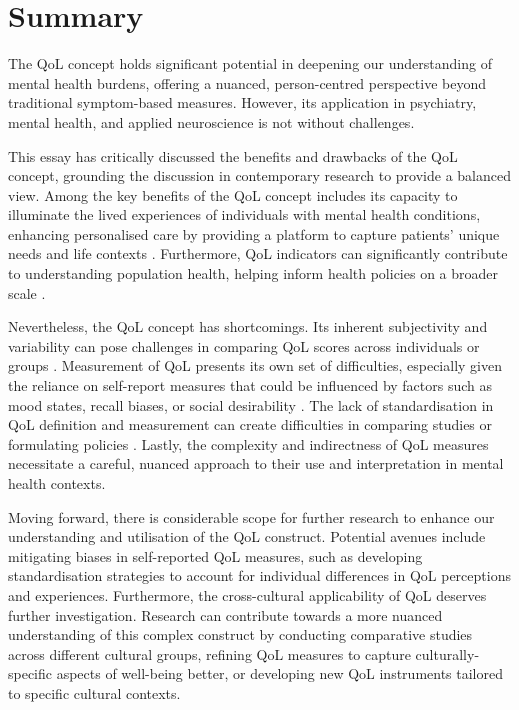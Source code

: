 \documentclass[10pt]{article}
\begin{document}
\begin{sloppypar}
  \section{Summary}
  \label{sec:summary}

  The QoL concept holds significant potential in deepening our understanding of mental health burdens, offering a nuanced, person-centred perspective beyond traditional symptom-based measures. However, its application in psychiatry, mental health, and applied neuroscience is not without challenges.

  This essay has critically discussed the benefits and drawbacks of the QoL concept, grounding the discussion in contemporary research to provide a balanced view. Among the key benefits of the QoL concept includes its capacity to illuminate the lived experiences of individuals with mental health conditions, enhancing personalised care by providing a platform to capture patients’ unique needs and life contexts \citep{dwamena_interventions_2012,endicott_quality_1993}. Furthermore, QoL indicators can significantly contribute to understanding population health, helping inform health policies on a broader scale \citep{gbd_2017_disease_and_injury_incidence_and_prevalence_collaborators_global_2018}.

  Nevertheless, the QoL concept has shortcomings. Its inherent subjectivity and variability can pose challenges in comparing QoL scores across individuals or groups \citep{skevington_expecting_2012}. Measurement of QoL presents its own set of difficulties, especially given the reliance on self-report measures that could be influenced by factors such as mood states, recall biases, or social desirability \citep{bowling_just_2005}. The lack of standardisation in QoL definition and measurement can create difficulties in comparing studies or formulating policies \citep{matarazzo_behavioral_1980}. Lastly, the complexity and indirectness of QoL measures necessitate a careful, nuanced approach to their use and interpretation in mental health contexts.

  Moving forward, there is considerable scope for further research to enhance our understanding and utilisation of the QoL construct. Potential avenues include mitigating biases in self-reported QoL measures, such as developing standardisation strategies to account for individual differences in QoL perceptions and experiences. Furthermore, the cross-cultural applicability of QoL deserves further investigation. Research can contribute towards a more nuanced understanding of this complex construct by conducting comparative studies across different cultural groups, refining QoL measures to capture culturally-specific aspects of well-being better, or developing new QoL instruments tailored to specific cultural contexts.


\end{sloppypar}
\end{document}
